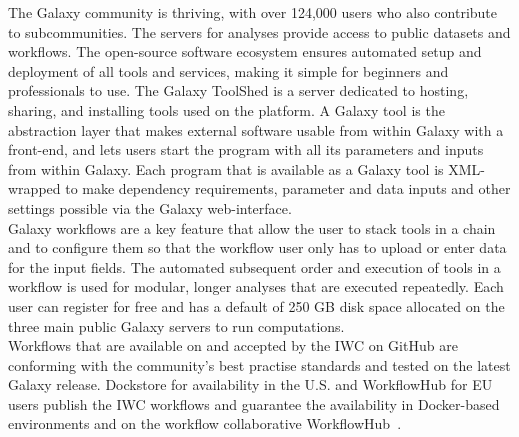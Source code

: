 The Galaxy community is thriving, with over 124,000 users who also contribute to subcommunities. The servers for analyses provide access to public datasets and workflows. The open-source software ecosystem ensures automated setup and deployment of all tools and services, making it simple for beginners and professionals to use. The Galaxy ToolShed is a server dedicated to hosting, sharing, and installing tools used on the platform. A Galaxy tool is the abstraction layer that makes external software usable from within Galaxy with a front-end, and lets users start the program with all its parameters and inputs from within Galaxy. Each program that is available as a Galaxy tool is XML-wrapped to make dependency requirements, parameter and data inputs and other settings possible via the Galaxy web-interface. \\ 
Galaxy workflows are a key feature that allow the user to stack tools in a chain and to configure them so that the workflow user only has to upload or enter data for the input fields. The automated subsequent order and execution of tools in a workflow is used for modular, longer analyses that are executed repeatedly. Each user can register for free and has a default of 250 GB disk space allocated on the three main public Galaxy servers to run computations. \\
Workflows that are available on and accepted by the \ac{IWC} on GitHub are conforming with the community's best practise standards and tested on the latest Galaxy release. Dockstore for availability in the U.S. and WorkflowHub for EU users publish the \ac{IWC} workflows and guarantee the availability in Docker-based environments and on the workflow collaborative WorkflowHub~\cite{o2017dockstore, goble2021implementing}.

